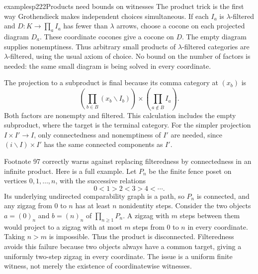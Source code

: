 \begin{dcomment}{examples}{p222}{Products need bounds on witnesses}
The product trick is the first way Grothendieck makes independent choices simultaneous.  If each $I_a$ is $\lambda$-filtered and $D:K\to\prod_a I_a$ has fewer than $\lambda$ arrows, choose a cocone on each projected diagram $D_a$.  These coordinate cocones give a cocone on $D$.  The empty diagram supplies nonemptiness.  Thus arbitrary small products of $\lambda$-filtered categories are $\lambda$-filtered, using the usual axiom of choice.  No bound on the number of factors is needed: the same small diagram is being solved in every coordinate.

The projection to a subproduct is final because its comma category at $(x_b)$ is
\[
 \left(\prod_{b\in B}(x_b\backslash I_b)\right)
 \times\left(\prod_{a\notin B}I_a\right).
\]
Both factors are nonempty and filtered.  This calculation includes the empty subproduct, where the target is the terminal category.  For the simpler projection $I\times I'\to I$, only connectedness and nonemptiness of $I'$ are needed, since $(i\backslash I)\times I'$ has the same connected components as $I'$.

Footnote 97 correctly warns against replacing filteredness by connectedness in an infinite product.  Here is a full example.  Let $P_n$ be the finite fence poset on vertices $0,1,\ldots,n$, with the successive relations
\[
 0<1>2<3>4<\cdots.
\]
Its underlying undirected comparability graph is a path, so $P_n$ is connected, and any zigzag from $0$ to $n$ has at least $n$ nonidentity steps.  Consider the two objects $a=(0)_n$ and $b=(n)_n$ of $\prod_{n\geq1}P_n$.  A zigzag with $m$ steps between them would project to a zigzag with at most $m$ steps from $0$ to $n$ in every coordinate.  Taking $n>m$ is impossible.  Thus the product is disconnected.  Filteredness avoids this failure because two objects always have a common target, giving a uniformly two-step zigzag in every coordinate.  The issue is a uniform finite witness, not merely the existence of coordinatewise witnesses.
\end{dcomment}

